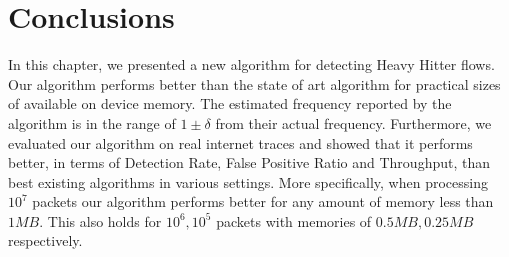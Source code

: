 \section{Conclusions}
\label{sec:conclusions}

In this chapter, we presented a new algorithm for  detecting Heavy Hitter flows.  Our algorithm   performs better than the state of art algorithm for practical sizes of available on device memory. The estimated frequency reported by the algorithm is in the range of $1\pm \delta$ from their actual frequency. Furthermore, we evaluated our algorithm on real internet traces and showed that it performs better, in terms of Detection Rate, False Positive Ratio and Throughput, than best existing  algorithms in various settings. More specifically, when processing $10^7$ packets our algorithm performs better for any amount of memory less than $1MB$. This also holds for $10^6, 10^5$ packets with memories of $0.5MB, 0.25MB$ respectively.